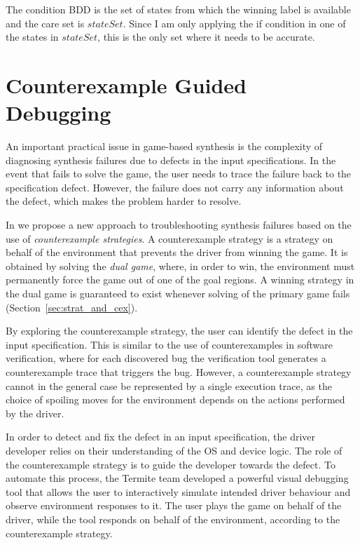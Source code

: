 The condition BDD is the set of states from which the winning label is available and the care set is $stateSet$. Since I am only applying the if condition in one of the states in $stateSet$, this is the only set where it needs to be accurate. 

\section{Counterexample Guided Debugging}
\label{s:debug}

An important practical issue in game-based synthesis is the complexity of diagnosing synthesis failures due to defects in the input specifications.  In the event that \termite fails to solve the game, the user needs to trace the failure back to the specification defect.  However, the failure does not carry any information about the defect, which makes the problem harder to resolve.

In \termite we propose a new approach to troubleshooting synthesis failures based on the use of \emph{counterexample strategies}.  A counterexample strategy is a strategy on behalf of the environment that prevents the driver from winning the game.  It is obtained by solving the \emph{dual game}, where, in order to win, the environment must permanently force the game out of one of the goal regions.  A winning strategy in the dual game is guaranteed to exist whenever solving of the primary game fails (Section~\ref{sec:strat_and_cex}).

By exploring the counterexample strategy, the user can identify the defect in the input specification.  This is similar to the use of counterexamples in software verification, where for each discovered bug the verification tool generates a counterexample trace that triggers the bug.  However, a counterexample strategy cannot in the general case be represented by a single execution trace, as the choice of spoiling moves for the environment depends on the actions performed by the driver.

In order to detect and fix the defect in an input specification, the driver developer relies on their  understanding of the OS and device logic.  The role of the counterexample strategy is to guide the developer towards the defect.  To automate this process, the Termite team developed a powerful visual debugging tool that allows the user to interactively simulate intended driver behaviour and observe environment responses to it.  The user plays the game on behalf of the driver, while the tool responds on behalf of the environment, according to the counterexample strategy.
 
